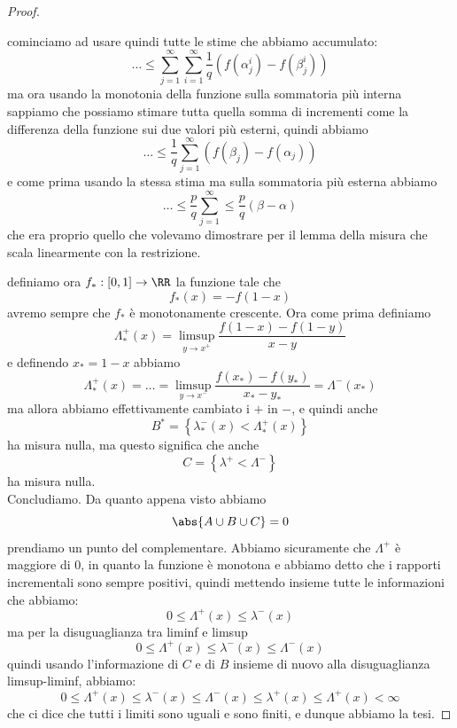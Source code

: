 \documentclass[11pt]{scrartcl}
\begin{document}
\begin{proof}
\begin{subproof}
	 		cominciamo ad usare quindi tutte le stime che abbiamo accumulato:
	 		$$\dots\le \sum_{j=1}^{\infty}\sum_{i=1}^{\infty}\frac{1}{q}\left(f\left(\alpha_j^i\right)-f\left(\beta_j^i\right)\right)$$
	 		ma ora usando la monotonia della funzione sulla sommatoria più interna sappiamo che possiamo stimare tutta quella somma di incrementi come la differenza della funzione sui due valori più esterni, quindi abbiamo
	 		$$\dots\le \frac{1}{q}\sum_{j=1}^{\infty}\left(f\left(\beta_j\right)-f\left(\alpha_j\right)\right)$$
	 		e come prima usando la stessa stima ma sulla sommatoria più esterna abbiamo
	 		$$\dots\le \frac{p}{q}\sum_{j=1}^{\infty}\le \frac{p}{q}(\beta-\alpha)$$
	 		che era proprio quello che volevamo dimostrare per il lemma della misura che scala linearmente con la restrizione.
	 	\end{subproof}
	 	definiamo ora $f_*:[0,1]\to\RR$ la funzione tale che 
	 	$$f_*(x)=-f(1-x)$$
	 	avremo sempre che $f_*$ è monotonamente crescente. Ora come prima definiamo $$\Lambda_*^+(x)=\limsup_{y\to x^+}\frac{f(1-x)-f(1-y)}{x-y}$$
	 	e definendo $x_*=1-x$ abbiamo
	 	$$\Lambda_*^+(x)=\dots=\limsup_{y\to x^-}\frac{f(x_*)-f(y_*)}{x_*-y_*}=\Lambda^-(x_*)$$
	 	ma allora abbiamo effettivamente cambiato i $+$ in $-$, e quindi anche 
	 	$$B^*=\left\{\lambda_*^-(x)< \Lambda_*^+(x)\right\}$$
	 	ha misura nulla, ma questo significa che anche 
	 	$$C=\left\{\lambda^+<\Lambda^-\right\}$$ 
	 	ha misura nulla. \\
	 	Concludiamo. Da quanto appena visto abbiamo
	 	$$\abs{A\cup B\cup C}=0$$
	 	prendiamo un punto del complementare. Abbiamo sicuramente che $\Lambda^+$ è maggiore di $0$, in quanto la funzione è monotona e abbiamo detto che i rapporti incrementali sono sempre positivi, quindi mettendo insieme tutte le informazioni che abbiamo:
	 	$$0\le \Lambda^+(x)\le \lambda^-(x)$$
	 	ma per la disuguaglianza tra liminf e limsup
	 	$$0\le \Lambda^+(x)\le \lambda^-(x)\le \Lambda^-(x)$$
	 	quindi usando l'informazione di $C$ e di $B$ insieme di nuovo alla disuguaglianza limsup-liminf, abbiamo:
	 	$$0\le \Lambda^+(x)\le \lambda^-(x)\le \Lambda^-(x) \le \lambda^+(x)\le \Lambda^+(x)<\infty$$
	 	che ci dice che tutti i limiti sono uguali e sono finiti, e dunque abbiamo la tesi.
	 \end{proof}
	 
	 \newpage
	 
\end{document}
